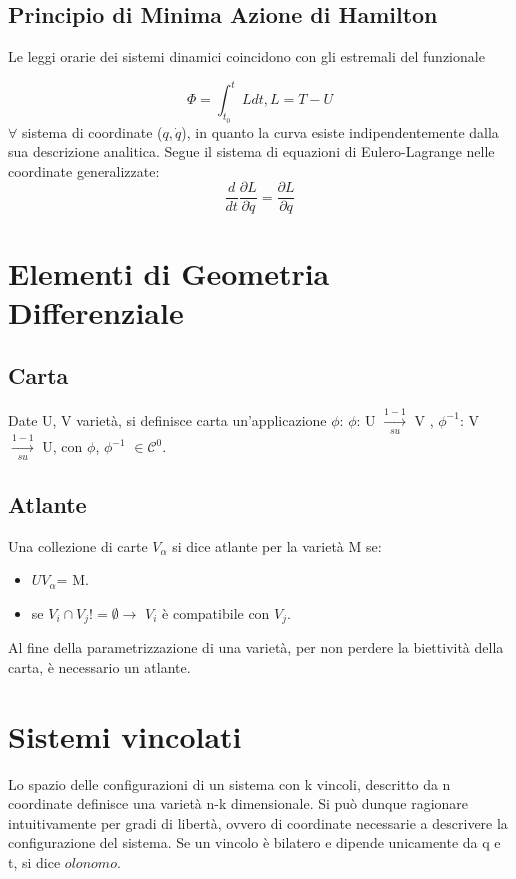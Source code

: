 \documentclass{article}
\begin{document}
\subsection{Principio di Minima Azione di Hamilton}

Le leggi orarie dei sistemi dinamici coincidono con gli estremali del funzionale

\begin{equation}
    \Phi = \int_{t_0}^{t} L dt , L=T-U
\end{equation}
$\forall$ sistema di coordinate ($q, \dot q$), in quanto la curva esiste indipendentemente dalla sua descrizione analitica.
Segue il sistema di equazioni di Eulero-Lagrange nelle coordinate generalizzate:
\begin{equation}
    \frac{d}{dt}\frac{\partial L}{\partial \dot q}= \frac{\partial L}{\partial q}
\end{equation}

\section{Elementi di Geometria Differenziale}

\subsection{Carta}
Date U, V varietà,  si definisce carta un'applicazione $\phi$: $\phi$: U $\xrightarrow[su]{1-1}$ V , $\phi^{-1}$: V $\xrightarrow[su]{1-1}$ U, con $\phi$, $\phi^{-1}$ $\in$$ \mathcal{C}^0$.

            \subsection{Atlante}
            Una collezione di carte $V_\alpha$ si dice atlante per la varietà M se:
            \begin{itemize}
                \item $U V_\alpha$= M.
                \item se $V_i \cap V_j != \emptyset \rightarrow$ $V_i$ è compatibile con $V_j$.
            \end{itemize}
            Al fine della parametrizzazione di una varietà, per non perdere la biettività della carta, è necessario un atlante.

            \section{Sistemi vincolati}
            Lo spazio delle configurazioni di un sistema con k vincoli, descritto da n coordinate definisce una varietà n-k dimensionale. Si può dunque ragionare intuitivamente per gradi di libertà, ovvero di coordinate necessarie a descrivere la configurazione del sistema.
            Se un vincolo è bilatero e dipende unicamente da q e t, si dice $olonomo$.
\end{document}
